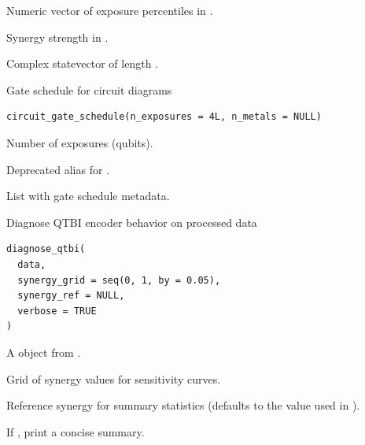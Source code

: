 \documentclass[a4paper]{book}
\begin{document}
%
\begin{Arguments}
\begin{ldescription}
\item[\code{percentiles}] Numeric vector of exposure percentiles in \AsIs{\texttt{[0, 1]}}.

\item[\code{synergy}] Synergy strength in \AsIs{\texttt{[0, 1]}}.
\end{ldescription}
\end{Arguments}
%
\begin{Value}
Complex statevector of length .
\end{Value}
%
\begin{Description}
Gate schedule for circuit diagrams
\end{Description}
%
\begin{Usage}
\begin{verbatim}
circuit_gate_schedule(n_exposures = 4L, n_metals = NULL)
\end{verbatim}
\end{Usage}
%
\begin{Arguments}
\begin{ldescription}
\item[\code{n\_exposures}] Number of exposures (qubits).

\item[\code{n\_metals}] Deprecated alias for .
\end{ldescription}
\end{Arguments}
%
\begin{Value}
List with gate schedule metadata.
\end{Value}
%
\begin{Description}
Diagnose QTBI encoder behavior on processed data
\end{Description}
%
\begin{Usage}
\begin{verbatim}
diagnose_qtbi(
  data,
  synergy_grid = seq(0, 1, by = 0.05),
  synergy_ref = NULL,
  verbose = TRUE
)
\end{verbatim}
\end{Usage}
%
\begin{Arguments}
\begin{ldescription}
\item[\code{data}] A  object from .

\item[\code{synergy\_grid}] Grid of synergy values for sensitivity curves.

\item[\code{synergy\_ref}] Reference synergy for summary statistics (defaults to
the value used in ).

\item[\code{verbose}] If , print a concise summary.
\end{ldescription}
\end{Arguments}
\end{document}
